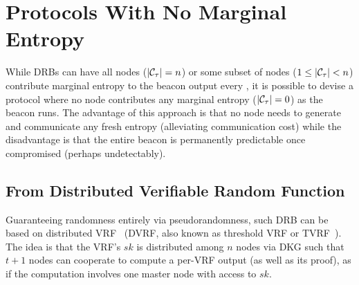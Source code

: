 
\section{Protocols With No Marginal Entropy}
\label{section:dvrf}
While DRBs can have all nodes ($|\mathcal{C}_\tau| = n$) or some subset of nodes ($1 \leq |\mathcal{C}_\tau| < n$) contribute marginal entropy to the beacon output every \epoch, it is possible to devise a protocol where no node contributes any marginal entropy ($|\mathcal{C}_\tau| = 0$) as the beacon runs. The advantage of this approach is that no node needs to generate and communicate any fresh entropy (alleviating communication cost) while the disadvantage is that the entire beacon is permanently predictable once compromised (perhaps undetectably).

\subsection{From Distributed Verifiable Random Function}
Guaranteeing randomness entirely via pseudorandomness, such DRB can be based on distributed VRF~\cite{groth2021non,camenisch2022internet,galindo2020fully} (DVRF, also known as threshold VRF or TVRF~\cite{cascudomt}). The idea is that the VRF's $sk$ is distributed among $n$ nodes via DKG such that $t + 1$ nodes can cooperate to compute a per-\epoch VRF output (as well as its proof), as if the computation involves one master node with access to $sk$.

